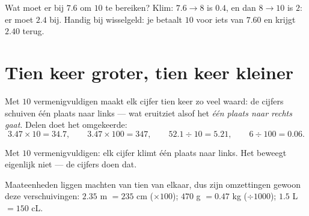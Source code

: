 \begin{example}\label{ex:g5:decimalops:complement}
Wat moet er bij $7.6$ om $10$ te bereiken? Klim: $7.6 \to 8$ is $0.4$, en
dan $8 \to 10$ is $2$: er moet $2.4$ bij. Handig bij wisselgeld: je betaalt
$10$ voor iets van $7.60$ en krijgt $2.40$ terug.
\end{example}

\section{Tien keer groter, tien keer kleiner}

\begin{proposition}\label{prop:g5:decimalops:shift}
Met $10$ vermenigvuldigen maakt elk cijfer tien keer zo veel waard: de
cijfers schuiven één plaats naar links --- wat eruitziet alsof het
\emph{ één plaats naar rechts gaat}. Delen doet het
omgekeerde:
\[
3.47 \times 10 = 34.7, \qquad
3.47 \times 100 = 347, \qquad
52.1 \div 10 = 5.21, \qquad
6 \div 100 = 0.06 .
\]
\end{proposition}
\admitted

\begin{omfigure}

{\small Met $10$ vermenigvuldigen: elk cijfer klimt één plaats naar links.
Het  beweegt eigenlijk niet --- de cijfers doen dat.}
\end{omfigure}

\begin{example}\label{ex:g5:decimalops:convert}
Maateenheden liggen machten van tien van elkaar, dus zijn omzettingen
gewoon deze verschuivingen: $2.35$ m $= 235$ cm ($\times 100$); $470$ g
$= 0.47$ kg ($\div 1000$); $1.5$ L $= 150$ cL.
\end{example}

